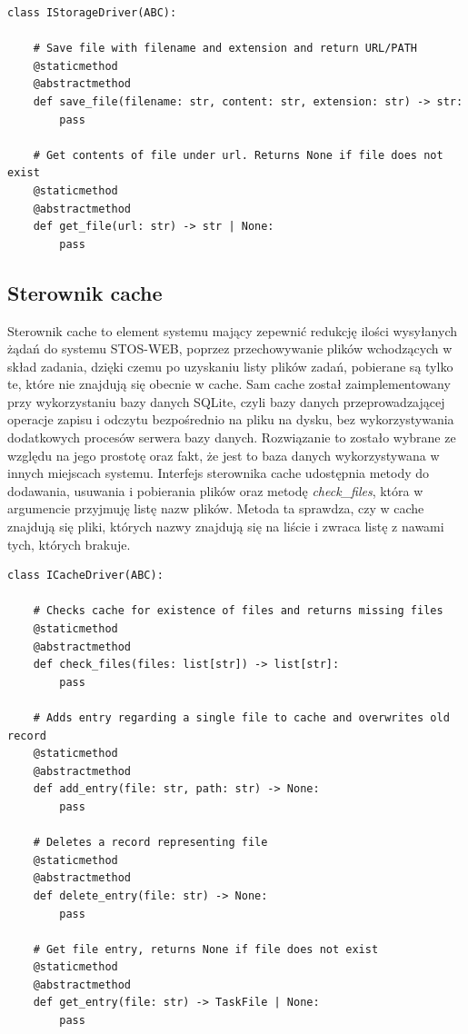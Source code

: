 \lstset{style=python}
\begin{lstlisting}[caption = {Interfejs sterownika systemu plików.}]
    class IStorageDriver(ABC):
    
    # Save file with filename and extension and return URL/PATH
    @staticmethod
    @abstractmethod
    def save_file(filename: str, content: str, extension: str) -> str:
        pass

    # Get contents of file under url. Returns None if file does not exist
    @staticmethod
    @abstractmethod
    def get_file(url: str) -> str | None:
        pass
\end{lstlisting}

\subsection{Sterownik cache}
Sterownik cache to element systemu mający zepewnić redukcję ilości wysyłanych żądań do systemu STOS-WEB, poprzez przechowywanie plików wchodzących w skład zadania, dzięki czemu po uzyskaniu listy plików zadań, pobierane są tylko te, które nie znajdują się obecnie w cache. Sam cache został zaimplementowany przy wykorzystaniu bazy danych SQLite\cite{sqlite}, czyli bazy danych przeprowadzającej operacje zapisu i odczytu bezpośrednio na pliku na dysku, bez wykorzystywania dodatkowych procesów serwera bazy danych. Rozwiązanie to zostało wybrane ze względu na jego prostotę oraz fakt, że jest to baza danych wykorzystywana w innych miejscach systemu. Interfejs sterownika cache udostępnia metody do dodawania, usuwania i pobierania plików oraz metodę \textit{check\_files}, która w argumencie przyjmuję listę nazw plików. Metoda ta sprawdza, czy w cache znajdują się pliki, których nazwy znajdują się na liście i zwraca listę z nawami tych, których brakuje.
\lstset{style=python}
\begin{lstlisting}[caption = {Interfejs sterownika systemu plików.}]
    class ICacheDriver(ABC):

    # Checks cache for existence of files and returns missing files
    @staticmethod
    @abstractmethod
    def check_files(files: list[str]) -> list[str]:
        pass

    # Adds entry regarding a single file to cache and overwrites old record
    @staticmethod
    @abstractmethod
    def add_entry(file: str, path: str) -> None:
        pass

    # Deletes a record representing file
    @staticmethod
    @abstractmethod
    def delete_entry(file: str) -> None:
        pass

    # Get file entry, returns None if file does not exist
    @staticmethod
    @abstractmethod
    def get_entry(file: str) -> TaskFile | None:
        pass
\end{lstlisting}

